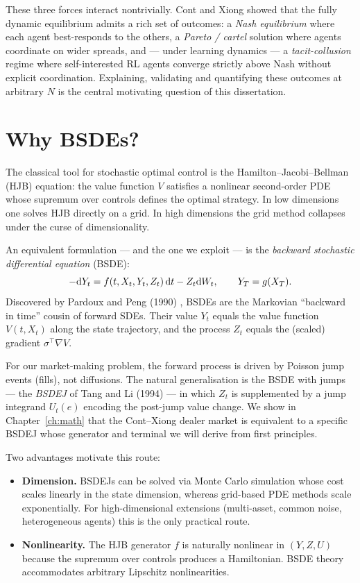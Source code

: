 These three forces interact nontrivially. Cont and Xiong \cite{cont2024} showed that the fully dynamic equilibrium admits a rich set of outcomes: a \emph{Nash equilibrium} where each agent best-responds to the others, a \emph{Pareto / cartel} solution where agents coordinate on wider spreads, and --- under learning dynamics --- a \emph{tacit-collusion} regime where self-interested RL agents converge strictly above Nash without explicit coordination. Explaining, validating and quantifying these outcomes at arbitrary $N$ is the central motivating question of this dissertation.

\section{Why BSDEs?}

The classical tool for stochastic optimal control is the Hamilton--Jacobi--Bellman (HJB) equation: the value function $V$ satisfies a nonlinear second-order PDE whose supremum over controls defines the optimal strategy. In low dimensions one solves HJB directly on a grid. In high dimensions the grid method collapses under the curse of dimensionality.

An equivalent formulation --- and the one we exploit --- is the \emph{backward stochastic differential equation} (BSDE):
\begin{equation}
  -\mathrm{d} Y_t = f(t, X_t, Y_t, Z_t)\,\mathrm{d} t - Z_t \mathrm{d} W_t, \qquad Y_T = g(X_T).
  \label{eq:intro-bsde}
\end{equation}
Discovered by Pardoux and Peng (1990) \cite{pardoux1990}, BSDEs are the Markovian ``backward in time'' cousin of forward SDEs. Their value $Y_t$ equals the value function $V(t, X_t)$ along the state trajectory, and the process $Z_t$ equals the (scaled) gradient $\sigma^\top \nabla V$.

For our market-making problem, the forward process is driven by Poisson jump events (fills), not diffusions. The natural generalisation is the BSDE with jumps --- the \emph{BSDEJ} of Tang and Li (1994) \cite{tang1994} --- in which $Z_t$ is supplemented by a jump integrand $U_t(e)$ encoding the post-jump value change. We show in Chapter~\ref{ch:math} that the Cont--Xiong dealer market is equivalent to a specific BSDEJ whose generator and terminal we will derive from first principles.

Two advantages motivate this route:
\begin{itemize}
  \item \textbf{Dimension.}  BSDEJs can be solved via Monte Carlo simulation whose cost scales linearly in the state dimension, whereas grid-based PDE methods scale exponentially. For high-dimensional extensions (multi-asset, common noise, heterogeneous agents) this is the only practical route.
  \item \textbf{Nonlinearity.}  The HJB generator $f$ is naturally nonlinear in $(Y, Z, U)$ because the supremum over controls produces a Hamiltonian. BSDE theory accommodates arbitrary Lipschitz nonlinearities.
\end{itemize}

